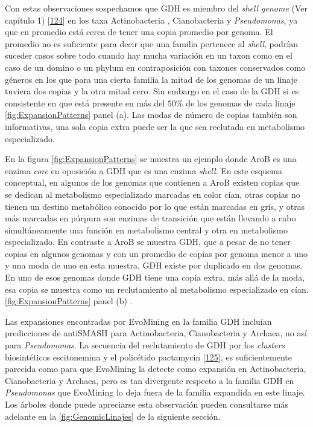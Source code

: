 \documentclass[12pt,twoside]{reedthesis}
\begin{document}
  Con estas observaciones sospechamos que GDH es miembro del \emph{shell
  genome} (Ver capítulo 1)
  {[}\protect\hyperlink{ref-koonin_genomics_2008}{124}{]} en los taxa
  Actinobacteria , Cianobacteria y \emph{Pseudomonas}, ya que en promedio
  está cerca de tener una copia promedio por genoma. El promedio no es
  suficiente para decir que una familia pertenece al \emph{shell}, podrían
  suceder casos sobre todo cuando hay mucha variación en un taxon como en
  el caso de un domino o un phylum en contraposición con taxones
  conservados como géneros en los que para una cierta familia la mitad de
  los genomas de un linaje tuviera dos copias y la otra mitad cero. Sin
  embargo en el caso de la GDH si es consistente en que está presente en
  más del \(50\%\) de los genomas de cada linaje
  \autoref{fig:ExpansionPatterns} panel (a). Las modas de número de copias
  también son informativas, una sola copia extra puede ser la que sea
  reclutada en metabolismo especializado.
  
  En la figura \autoref{fig:ExpansionPatterns} se muestra un ejemplo donde
  AroB es una enzima \emph{core} en oposición a GDH que es una enzima
  \emph{shell}. En este esquema conceptual, en algunos de los genomas que
  contienen a AroB existen copias que se dedican al metabolismo
  especializado marcadas en color cían, otras copias no tienen un destino
  metabólico conocido por lo que están marcadas en gris, y otras más
  marcadas en púrpura son enzimas de transición que están llevando a cabo
  simultáneamente una función en metabolismo central y otra en metabolismo
  especializado. En contraste a AroB se muestra GDH, que a pesar de no
  tener copias en algunos genomas y con un promedio de copias por genoma
  menor a uno y una moda de uno en esta muestra, GDH existe por duplicado
  en dos genomas. En uno de esos genomas donde GDH tiene una copia extra,
  más allá de la moda, esa copia se muestra como un reclutamiento al
  metabolismo especializado en cían. \autoref{fig:ExpansionPatterns} panel
  (b) .
  
  Las expansiones encontradas por EvoMining en la familia GDH incluían
  predicciones de antiSMASH para Actinobacteria, Cianobacteria y Archaea,
  no así para \emph{Pseudomonas}. La secuencia del reclutamiento de GDH
  por los \emph{clusters} biosintéticos escitonemina y el policétido
  pactamycin {[}\protect\hyperlink{ref-kudo_cloning_2007}{125}{]}, es
  suficientemente parecida como para que EvoMining la detecte como
  expansión en Actinobacteria, Cianobacteria y Archaea, pero es tan
  divergente respecto a la familia GDH en \emph{Pseudomonas} que EvoMining
  lo deja fuera de la familia expandida en este linaje. Los árboles donde
  puede apreciarse esta observación pueden consultarse más adelante en la
  \autoref{fig:GenomicLinajes} de la siguiente sección.
  
\end{document}
